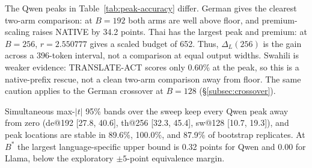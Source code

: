 \documentclass[11pt]{article}
\begin{document}
\begin{table}[t]
\centering
\small
\caption{Peak length-normalization effects, where \(\Delta_L(B)=\operatorname{acc}_N(\lfloor rB\rfloor)-\operatorname{acc}_N(B)\), together with values at the frozen budgets. Intervals are pointwise item-clustered bootstrap 95\% CIs. The independent column is the same estimand on the confirmation sample of \S\ref{sec:design}, evaluated at the discovery peak budget rather than at a re-selected argmax.}
\label{tab:peak-accuracy}
\end{table}

The Qwen peaks in Table~\ref{tab:peak-accuracy} differ. German gives the clearest two-arm comparison: at \(B=192\) both arms are well above floor, and premium-scaling raises NATIVE by 34.2 points. Thai has the largest peak and premium: at \(B=256\), \(r=2.550777\) gives a scaled budget of 652. Thus, \(\Delta_L(256)\) is the gain across a 396-token interval, not a comparison at equal output widths. Swahili is weaker evidence: TRANSLATE-ACT scores only 0.60\% at the peak, so this is a native-prefix rescue, not a clean two-arm comparison away from floor. The same caution applies to the German crossover at \(B=128\) (\S\ref{subsec:crossover}).

Simultaneous max-\(|t|\) 95\% bands over the sweep keep every Qwen peak away from zero (de@192 [27.8, 40.6], th@256 [32.3, 45.4], sw@128 [10.7, 19.3]), and peak locations are stable in 89.6\%, 100.0\%, and 87.9\% of bootstrap replicates. At \(B^*\) the largest language-specific upper bound is 0.32 points for Qwen and 0.00 for Llama, below the exploratory \(\pm5\)-point equivalence margin.
\end{document}
